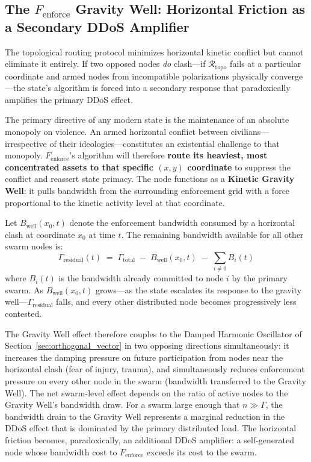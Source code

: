 \subsection{The \texorpdfstring{$F_{\text{enforce}}$}{F\_enforce} Gravity Well: Horizontal Friction as a Secondary DDoS Amplifier}
\label{subsec:gravity_well}

The topological routing protocol minimizes horizontal kinetic conflict but cannot eliminate it entirely. If two opposed nodes \textit{do} clash---if $\mathcal{R}_{\text{topo}}$ fails at a particular coordinate and armed nodes from incompatible polarizations physically converge---the state's algorithm is forced into a secondary response that paradoxically amplifies the primary DDoS effect.

The primary directive of any modern state is the maintenance of an absolute monopoly on violence. An armed horizontal conflict between civilians---irrespective of their ideologies---constitutes an existential challenge to that monopoly. $F_{\text{enforce}}$'s algorithm will therefore \textbf{route its heaviest, most concentrated assets to that specific $(x,y)$ coordinate} to suppress the conflict and reassert state primacy. The node functions as a \textbf{Kinetic Gravity Well}: it pulls bandwidth from the surrounding enforcement grid with a force proportional to the kinetic activity level at that coordinate.

Let $B_{\text{well}}(x_0, t)$ denote the enforcement bandwidth consumed by a horizontal clash at coordinate $x_0$ at time $t$. The remaining bandwidth available for all other swarm nodes is:
\[
\Gamma_{\text{residual}}(t) \;=\; \Gamma_{\text{total}} \;-\; B_{\text{well}}(x_0, t) \;-\; \sum_{i \neq 0} B_i(t)
\]
where $B_i(t)$ is the bandwidth already committed to node $i$ by the primary swarm. As $B_{\text{well}}(x_0, t)$ grows---as the state escalates its response to the gravity well---$\Gamma_{\text{residual}}$ falls, and every other distributed node becomes progressively less contested.

The Gravity Well effect therefore couples to the Damped Harmonic Oscillator of Section~\ref{sec:orthogonal_vector} in two opposing directions simultaneously: it increases the damping pressure on future participation from nodes near the horizontal clash (fear of injury, trauma), and simultaneously reduces enforcement pressure on every other node in the swarm (bandwidth transferred to the Gravity Well). The net swarm-level effect depends on the ratio of active nodes to the Gravity Well's bandwidth draw. For a swarm large enough that $n \gg \Gamma$, the bandwidth drain to the Gravity Well represents a marginal reduction in the DDoS effect that is dominated by the primary distributed load. The horizontal friction becomes, paradoxically, an additional DDoS amplifier: a self-generated node whose bandwidth cost to $F_{\text{enforce}}$ exceeds its cost to the swarm.

